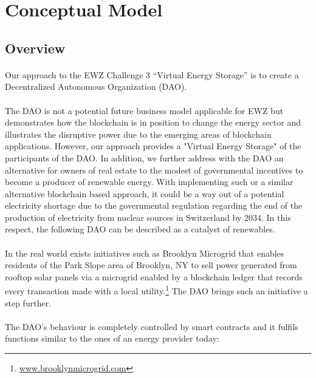 \documentclass{scrartcl}
\begin{document}
	\section{Conceptual Model}
	
	\subsection{Overview}

    \paragraph{}
    Our approach to the EWZ Challenge 3 “Virtual Energy Storage” is to create a Decentralized Autonomous Organization (DAO). 
    
    \paragraph{}
    The DAO is not a potential future business model applicable for EWZ but demonstrates how the blockchain is in position to change the energy sector and illustrates the disruptive power due to the emerging areas of blockchain applications. However, our approach provides a "Virtual Energy Storage" of the participants of the DAO. In addition, we further address with the DAO an alternative for owners of real estate to the modest of governmental incentives to become a producer of renewable energy. With implementing such or a similar alternative blockchain based approach, it could be a way out of a potential electricity shortage due to the governmental regulation regarding the end of the production of electricity from nuclear sources in Switzerland by 2034. In this respect, the following DAO can be described as a catalyst of renewables. 
    
    \paragraph{}
    In the real world exists initiatives such as Brooklyn Microgrid that enables residents of the Park Slope area of Brooklyn, NY to sell power generated from rooftop solar panels via a microgrid enabled by a blockchain ledger that records every transaction made with a local utility.\footnote{\url{www.brooklynmicrogrid.com}} The DAO brings such an initiative a step further.
    
    \paragraph{}
    The DAO's behaviour is completely controlled by smart contracts and it fulfils functions similar to the ones of an energy provider today:
   
\end{document}
